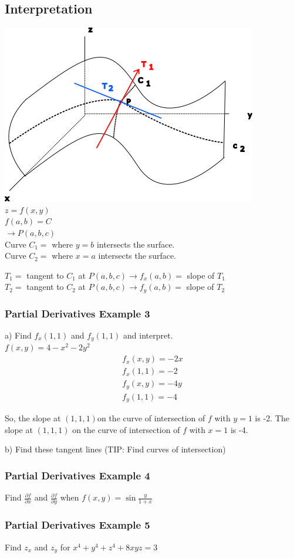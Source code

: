 \documentclass[12pt]{article}
\begin{document}
\subsection{Interpretation}
\includegraphics{partialderivativeslopes}\\
\(z=f(x,y)\)\\
\(f(a,b) = C\)\\
\(\rightarrow P(a,b,c)\)
\bigskip\\
Curve \(C_1 =\) where \(y=b\) intersects the surface. \\%
Curve \(C_2 = \) where \(x = a\) intersects the surface.

\(T_1=\) tangent to \(C_1\) at \(P(a,b,c)\rightarrow f_x(a,b) =\) slope of \(T_1\)\\%
\(T_2=\) tangent to \(C_2\) at \(P(a,b,c)\rightarrow f_y(a,b) =\) slope of \(T_2\)

\subsubsection{Partial Derivatives Example 3}
a) Find \(f_x(1,1)\)  and \(f_y(1,1)\) and interpret.\\
\(f(x,y) = 4-x^2-2y^2\) 
\begin{align}
	f_x(x,y) = -2x\\
	f_x(1,1) = -2\\
	f_y(x,y) = -4y\\
	f_y(1,1) = -4
\end{align}

So, the slope at \((1,1,1)\)on the curve of intersection of \(f\) with \(y=1\) is -2.
The slope at \((1,1,1)\) on the curve of intersection of \(f\) with \(x=1\) is -4.

b) Find these tangent lines (TIP: Find curves of intersection)

\subsubsection{Partial Derivatives Example 4}
Find \(\frac{\partial f}{\partial x} \) and \(\frac{\partial f}{\partial y} \) when \(f(x,y) = \sin \frac{y}{1+x}\) 

\subsubsection{Partial Derivatives Example 5}
Find \(z_x\) and \(z_y\) for \(x^4 + y^4 + z^4 + 8xyz = 3\) 
\end{document}
